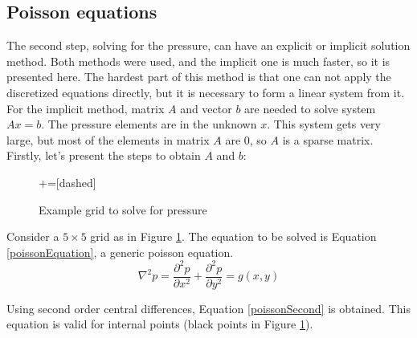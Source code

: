 \documentclass[journal]{IEEEtran}
\begin{document}
\subsection{Poisson equations}

The second step, solving for the pressure, can have an explicit or implicit solution method. Both methods were used, and the implicit one is much faster, so it is presented here. The hardest part of this method is that one can not apply the discretized equations directly, but it is necessary to form a linear system from it. For the implicit method, matrix $A$ and vector $b$ are needed to solve system $Ax = b$. The pressure elements are in the unknown $x$. This system gets very large, but most of the elements in matrix $A$ are 0, so $A$ is a sparse matrix. Firstly, let's present the steps to obtain $A$ and $b$:

\begin{figure}[!ht]
\centering
{}+=[dashed]%
\caption{Example grid to solve for pressure\label{examplePressureGrid}}
\end{figure}

Consider a $5\times 5$ grid as in Figure \ref{examplePressureGrid}. The equation to be solved is Equation \ref{poissonEquation}, a generic poisson equation. 
\begin{equation}
\nabla^2 p = \frac{\partial^2 p}{\partial x^2} + \frac{\partial^2 p}{\partial y^2} = g(x,y)\label{poissonEquation}
\end{equation}

Using second order central differences, Equation \ref{poissonSecond} is obtained. This equation is valid for internal points (black points in Figure \ref{examplePressureGrid}).
\end{document}

